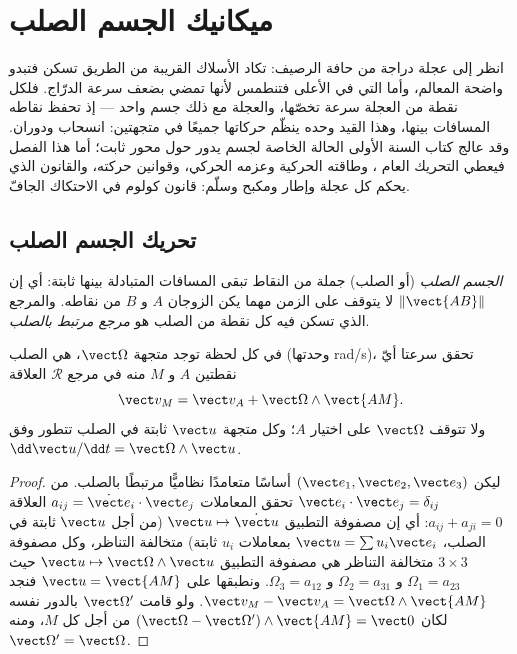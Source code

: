 \chapter{ميكانيك الجسم الصلب}\label{ch:b2:rigid-body-mechanics}

انظر إلى عجلة دراجة من حافة الرصيف: تكاد الأسلاك القريبة من
الطريق تسكن فتبدو واضحة المعالم، وأما التي في الأعلى فتنطمس
لأنها تمضي بضعف سرعة الدرّاج. فلكل نقطة من العجلة سرعة تخصّها،
والعجلة مع ذلك جسم واحد --- إذ تحفظ نقاطه المسافات بينها، وهذا
القيد وحده ينظّم حركاتها جميعًا في متجهتين: انسحاب ودوران. وقد
عالج كتاب السنة الأولى الحالة الخاصة لجسم يدور حول محور ثابت؛
أما هذا الفصل فيعطي التحريك العام ، وطاقته الحركية
وعزمه الحركي، وقوانين حركته، والقانون الذي يحكم كل عجلة وإطار
ومكبح وسلّم: قانون كولوم في الاحتكاك الجافّ.

\section{تحريك الجسم الصلب}

\begin{definition}\label{def:b2:rigid-body-mechanics:solid}
\emph{الجسم الصلب} (أو الصلب) جملة من النقاط تبقى المسافات
المتبادلة بينها ثابتة: أي إن $\|\vect{AB}\|$ لا يتوقف على الزمن
مهما يكن الزوجان $A$ و $B$ من نقاطه. والمرجع الذي تسكن فيه كل
نقطة من الصلب هو \emph{مرجع مرتبط بالصلب}.
\end{definition}

\begin{theorem}\label{thm:b2:rigid-body-mechanics:field}
في كل لحظة توجد متجهة $\vect\Omega$، هي \emph{} الصلب
(وحدتها \unit{rad/s})، تحقق سرعتا أيّ نقطتين $A$ و $M$ منه في مرجع
$\mathcal R$ العلاقة
\[
\vect v_M = \vect v_A + \vect\Omega\wedge\vect{AM} .
\]
ولا تتوقف $\vect\Omega$ على اختيار $A$؛ وكل متجهة $\vect u$ ثابتة في
الصلب تتطور وفق $\dd\vect u/\dd t = \vect\Omega\wedge\vect u$.
\end{theorem}

\begin{proof}
ليكن $(\vect e_1, \vect e_2, \vect e_3)$ أساسًا متعامدًا نظاميًّا مرتبطًا
بالصلب. من $\vect e_i\cdot\vect e_j = \delta_{ij}$ تحقق المعاملات
$a_{ij} = \dot{\vect e}_i\cdot\vect e_j$ العلاقة $a_{ij} + a_{ji} = 0$: أي إن
مصفوفة التطبيق $\vect u \mapsto \dot{\vect u}$ (من أجل $\vect u$ ثابتة في
الصلب، $\vect u = \sum u_i\vect e_i$ بمعاملات $u_i$ ثابتة) متخالفة
التناظر، وكل مصفوفة $3\times3$ متخالفة التناظر هي مصفوفة التطبيق
$\vect u \mapsto \vect\Omega\wedge\vect u$ حيث $\Omega_1 = a_{23}$ و
$\Omega_2 = a_{31}$ و $\Omega_3 = a_{12}$. ونطبقها على $\vect u =
\vect{AM}$ فنجد $\vect v_M - \vect v_A = \vect\Omega\wedge\vect{AM}$. ولو
قامت $\vect\Omega'$ بالدور نفسه لكان $(\vect\Omega - \vect\Omega')\wedge
\vect{AM} = \vect 0$ من أجل كل $M$، ومنه $\vect\Omega' = \vect\Omega$.
\end{proof}

